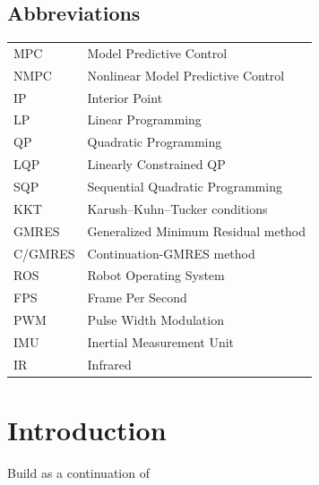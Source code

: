 \documentclass[a4paper, 12pt]{report}
\begin{document}
\subsection*{Abbreviations}
\begin{table}[h]
\centering
\begin{tabular}{p{8cm} p{8cm}}
MPC \dotfill & Model Predictive Control \\
NMPC \dotfill & Nonlinear Model Predictive Control \\
IP \dotfill & Interior Point \\
LP \dotfill & Linear Programming \\
QP \dotfill & Quadratic Programming \\
LQP \dotfill & Linearly Constrained QP \\
SQP \dotfill & Sequential Quadratic Programming \\
KKT \dotfill & Karush–Kuhn–Tucker conditions \\
GMRES \dotfill & Generalized Minimum Residual method \\
C/GMRES \dotfill & Continuation-GMRES method \\
ROS \dotfill & Robot Operating System \\
FPS \dotfill	 & Frame Per Second \\
PWM \dotfill & Pulse Width Modulation \\
IMU \dotfill & Inertial Measurement Unit \\
IR \dotfill & Infrared \\
\end{tabular} 
\end{table}

\newpage
{}
\listoftables

\newpage
{}
\listoffigures

\newpage
\setlength{\parskip}{1.5em}
\setlength{\parindent}{1em}
\setcounter{page}{1}

\section{Introduction}
Build as a continuation of \cite{Suzuki2014}

\newpage
\end{document}
